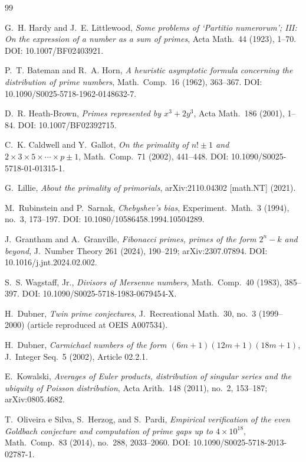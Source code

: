 \documentclass[11pt]{article}
\theoremstyle{definition}
\begin{document}
\begin{thebibliography}{99}\small

 G.~H. Hardy and J.~E. Littlewood,
\emph{Some problems of `Partitio numerorum'; III: On the expression of
a number as a sum of primes}, Acta Math.\ 44 (1923), 1--70.
DOI: 10.1007/BF02403921.

 P.~T. Bateman and R.~A. Horn,
\emph{A heuristic asymptotic formula concerning the distribution of
prime numbers}, Math.\ Comp.\ 16 (1962), 363--367.
DOI: 10.1090/S0025-5718-1962-0148632-7.

 D.~R. Heath-Brown,
\emph{Primes represented by $x^3+2y^3$},
Acta Math.\ 186 (2001), 1--84.  DOI: 10.1007/BF02392715.

 C.~K. Caldwell and Y.~Gallot,
\emph{On the primality of $n!\pm1$ and
$2\times3\times5\times\cdots\times p\pm1$},
Math.\ Comp.\ 71 (2002), 441--448.
DOI: 10.1090/S0025-5718-01-01315-1.

 G.~Lillie,
\emph{About the primality of primorials},
arXiv:2110.04302 [math.NT] (2021).

 M.~Rubinstein and P.~Sarnak,
\emph{Chebyshev's bias},
Experiment.\ Math.\ 3 (1994), no.~3, 173--197.
DOI: 10.1080/10586458.1994.10504289.

 J.~Grantham and A.~Granville,
\emph{Fibonacci primes, primes of the form $2^n-k$ and beyond},
J.~Number Theory 261 (2024), 190--219; arXiv:2307.07894.
DOI: 10.1016/j.jnt.2024.02.002.

 S.~S. Wagstaff, Jr.,
\emph{Divisors of Mersenne numbers},
Math.\ Comp.\ 40 (1983), 385--397.
DOI: 10.1090/S0025-5718-1983-0679454-X.

 H.~Dubner,
\emph{Twin prime conjectures},
J.~Recreational Math.\ 30, no.~3 (1999--2000) (article reproduced at
OEIS A007534).

 H.~Dubner,
\emph{Carmichael numbers of the form $(6m+1)(12m+1)(18m+1)$},
J.~Integer Seq.\ 5 (2002), Article 02.2.1.

 E.~Kowalski,
\emph{Averages of Euler products, distribution of singular series and
the ubiquity of Poisson distribution},
Acta Arith.\ 148 (2011), no.~2, 153--187; arXiv:0805.4682.

 T.~Oliveira e Silva, S.~Herzog, and S.~Pardi,
\emph{Empirical verification of the even Goldbach conjecture and
computation of prime gaps up to $4\times10^{18}$},
Math.\ Comp.\ 83 (2014), no.~288, 2033--2060.
DOI: 10.1090/S0025-5718-2013-02787-1.


\end{thebibliography}
\end{document}
